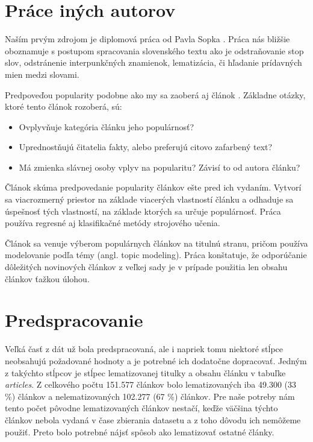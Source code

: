 \documentclass[runningheads,a4paper]{llncs}
\begin{document}
\section{Práce iných autorov}
Naším prvým zdrojom je diplomová práca od Pavla Sopka \cite{diplomovka}. 
Práca nás bližšie oboznamuje s postupom spracovania slovenského textu ako je odstraňovanie stop slov, odstránenie interpunkčných znamienok, lematizácia, či hľadanie prídavných mien medzi slovami.

Predpoveďou popularity podobne ako my sa zaoberá aj článok \cite{pulse}. Základne otázky, ktoré tento článok rozoberá, sú:
\begin{itemize}
\renewcommand{\labelitemi}{$\bullet$}
  \item Ovplyvňuje kategória článku jeho populárnosť?
  \item Uprednostňujú čitatelia fakty, alebo preferujú citovo zafarbený text?
  \item Má zmienka slávnej osoby vplyv na popularitu? Závisí to od autora článku?
\end{itemize}
Článok skúma predpovedanie popularity článkov ešte pred ich vydaním. Vytvorí sa viacrozmerný priestor na základe viacerých vlastností článku a odhaduje sa úspešnosť tých vlastností, na základe ktorých sa určuje populárnosť. Práca používa regresné aj klasifikačné metódy strojového učenia.

Článok \cite{topic} sa venuje výberom populárnych článkov na titulnú stranu, pričom používa modelovanie podľa témy (angl. topic modeling).
Práca konštatuje, že odporúčanie dôležitých novinových článkov z veľkej sady je v prípade použitia len obsahu článkov ťažkou úlohou.

\section{Predspracovanie}
Veľká časť z dát už bola predspracovaná, ale i napriek tomu niektoré stĺpce neobsahujú požadované hodnoty a je potrebné ich dodatočne dopracovať.
Jedným z takýchto stĺpcov je stĺpec lematizovanej titulky a obsahu článku v tabuľke {\em articles}.
Z celkového počtu 151.577 článkov bolo lematizovaných iba 49.300 (33 \%) článkov a nelematizovaných 102.277 (67 \%) článkov.
Pre naše potreby nám tento počet pôvodne lematizovaných článkov nestačí, keďže väčšina týchto článkov nebola vydaná v čase zbierania datasetu a z toho dôvodu ich nemôžeme použiť.
Preto bolo potrebné nájsť spôsob ako lematizovať ostatné články.
\end{document}
